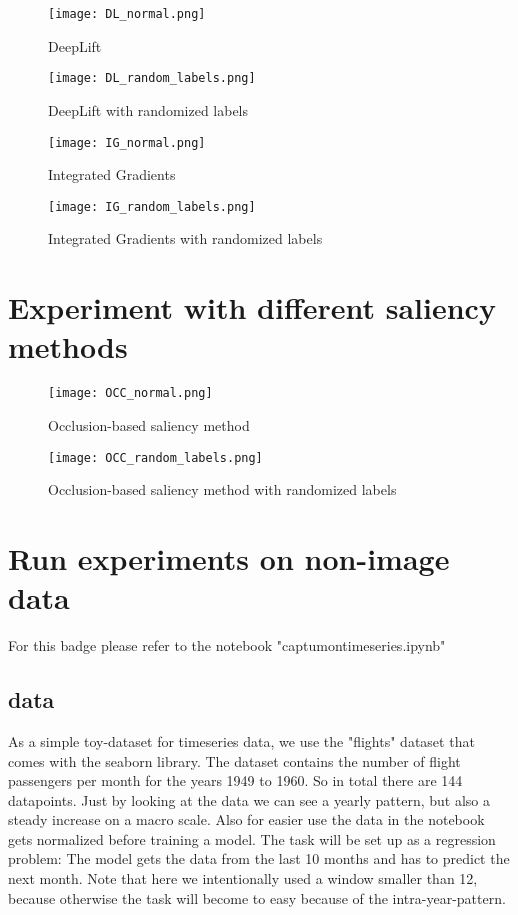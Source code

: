 \documentclass{article}
\begin{document}
\begin{figure}[h!]
\centering
\texttt{[image: DL\_normal.png]}
\caption{DeepLift}
\label{fig:dl_normal}
\end{figure}

\begin{figure}[h!]
\centering
\texttt{[image: DL\_random\_labels.png]}
\caption{DeepLift with randomized labels}
\label{fig:dl_random_labels}
\end{figure}

\begin{figure}[h!]
\centering
\texttt{[image: IG\_normal.png]}
\caption{Integrated Gradients}
\label{fig:ig_normal}
\end{figure}

\begin{figure}[h!]
\centering
\texttt{[image: IG\_random\_labels.png]}
\caption{Integrated Gradients with randomized labels}
\label{fig:ig_random_labels}
\end{figure}

\section{Experiment with different saliency methods}

\begin{figure}[h!]
\centering
\texttt{[image: OCC\_normal.png]}
\caption{Occlusion-based saliency method}
\label{fig:occ_normal}
\end{figure}

\begin{figure}[h!]
\centering
\texttt{[image: OCC\_random\_labels.png]}
\caption{Occlusion-based saliency method with randomized labels}
\label{fig:occ_random_labels}
\end{figure}

\section{Run experiments on non-image data}
For this badge please refer to the notebook "captum\textunderscore on\textunderscore timeseries.ipynb" 

\subsection{data}
As a simple toy-dataset for timeseries data, we use the "flights" dataset that comes with the seaborn library. The dataset contains the number of flight passengers per month for the years 1949 to 1960. So in total there are 144 datapoints. Just by looking at the data we can see a yearly pattern, but also a steady increase on a macro scale. Also for easier use the data in the notebook gets normalized before training a model. The task will be set up as a regression problem: The model gets the data from the last 10 months and has to predict the next month. Note that here we intentionally used a window smaller than 12, because otherwise the task will become to easy because of the intra-year-pattern.
\end{document}
